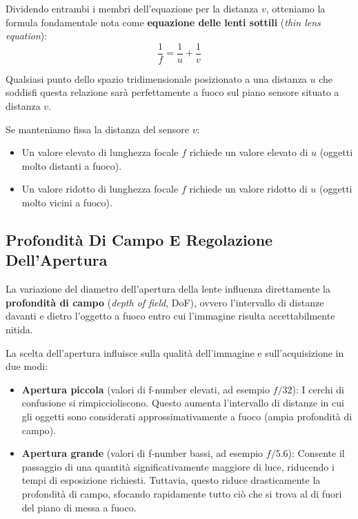 ﻿\documentclass[11pt, a4paper]{article}
\begin{document}
Dividendo entrambi i membri dell'equazione per la distanza $v$, otteniamo la formula fondamentale nota come \textbf{equazione delle lenti sottili} (\emph{thin lens equation}):
\begin{equation}
    \boxed{\frac{1}{f} = \frac{1}{u} + \frac{1}{v}}
\end{equation}

Qualsiasi punto dello spazio tridimensionale posizionato a una distanza $u$ che soddisfi questa relazione sarà perfettamente a fuoco sul piano sensore situato a distanza $v$.

Se manteniamo fissa la distanza del sensore $v$:
\begin{itemize}[noitemsep]
    \item Un valore elevato di lunghezza focale $f$ richiede un valore elevato di $u$ (oggetti molto distanti a fuoco).
    \item Un valore ridotto di lunghezza focale $f$ richiede un valore ridotto di $u$ (oggetti molto vicini a fuoco).
\end{itemize}

\newpage

\subsection{Profondità Di Campo E Regolazione Dell'Apertura}

La variazione del diametro dell'apertura della lente influenza direttamente la \textbf{profondità di campo} (\emph{depth of field}, DoF), ovvero l'intervallo di distanze davanti e dietro l'oggetto a fuoco entro cui l'immagine risulta accettabilmente nitida.


La scelta dell'apertura influisce sulla qualità dell'immagine e sull'acquisizione in due modi:
\begin{itemize}[noitemsep]
    \item \textbf{Apertura piccola} (valori di f-number elevati, ad esempio $f/32$): I cerchi di confusione si rimpiccioliscono. Questo aumenta l'intervallo di distanze in cui gli oggetti sono considerati approssimativamente a fuoco (ampia profondità di campo).
    \item \textbf{Apertura grande} (valori di f-number bassi, ad esempio $f/5.6$): Consente il passaggio di una quantità significativamente maggiore di luce, riducendo i tempi di esposizione richiesti. Tuttavia, questo riduce drasticamente la profondità di campo, sfocando rapidamente tutto ciò che si trova al di fuori del piano di messa a fuoco.
\end{itemize}
\end{document}
